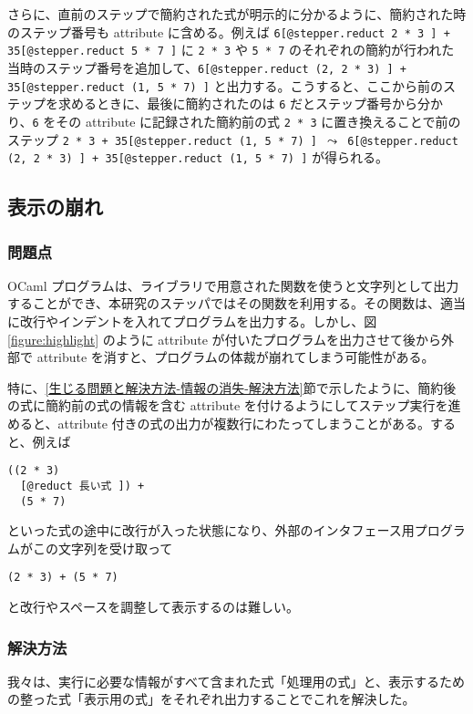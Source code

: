 さらに、直前のステップで簡約された式が明示的に分かるように、簡約された時のステップ番号も attribute に含める。例えば \texttt{6[@stepper.reduct 2 * 3 ] + 35[@stepper.reduct 5 * 7 ]} に \texttt{2 * 3} や \texttt{5 * 7} のそれぞれの簡約が行われた当時のステップ番号を追加して、\texttt{6[@stepper.reduct (2, 2 * 3) ] + 35[@stepper.reduct (1, 5 * 7) ]} と出力する。こうすると、ここから前のステップを求めるときに、最後に簡約されたのは \texttt{6} だとステップ番号から分かり、\texttt{6} をその attribute に記録された簡約前の式 \texttt{2 * 3} に置き換えることで前のステップ \texttt{2 * 3 + 35[@stepper.reduct (1, 5 * 7) ] $\leadsto$ 6[@stepper.reduct (2, 2 * 3) ] + 35[@stepper.reduct (1, 5 * 7) ]} が得られる。

\subsection{表示の崩れ}
\label{生じる問題と解決方法-表示の崩れ}
\subsubsection{問題点}
OCaml プログラムは、ライブラリで用意された関数を使うと文字列として出力することができ、本研究のステッパではその関数を利用する。その関数は、適当に改行やインデントを入れてプログラムを出力する。しかし、図\ref{figure:highlight} のように attribute が付いたプログラムを出力させて後から外部で attribute を消すと、プログラムの体裁が崩れてしまう可能性がある。

特に、\ref{生じる問題と解決方法-情報の消失-解決方法}節で示したように、簡約後の式に簡約前の式の情報を含む attribute を付けるようにしてステップ実行を進めると、attribute 付きの式の出力が複数行にわたってしまうことがある。すると、例えば
\begin{verbatim}
((2 * 3)
  [@reduct 長い式 ]) +
  (5 * 7)
\end{verbatim}
といった式の途中に改行が入った状態になり、外部のインタフェース用プログラムがこの文字列を受け取って
\begin{verbatim}
(2 * 3) + (5 * 7)
\end{verbatim}
と改行やスペースを調整して表示するのは難しい。

\subsubsection{解決方法}
\label{生じた問題と解決方法-表示の崩れ-解決方法}
我々は、実行に必要な情報がすべて含まれた式「処理用の式」と、表示するための整った式「表示用の式」をそれぞれ出力することでこれを解決した。

